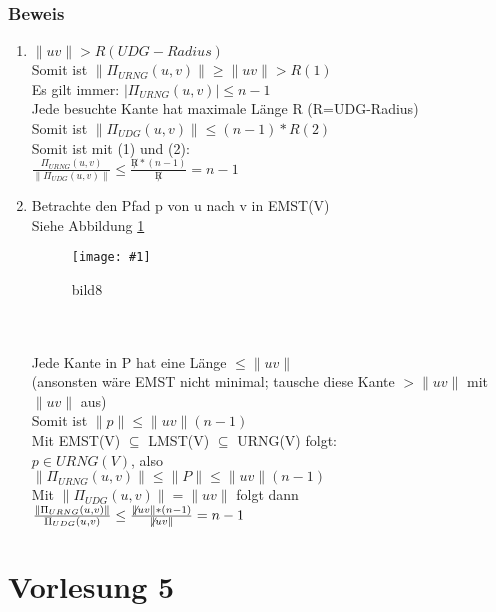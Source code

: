 \documentclass{article}
\newcommand{\bild}[4]{ %
	\begin{figure}[h!]
		\centering
		\texttt{[image: \#1]}
		\caption{#3}
		\label{#4}
	\end{figure}	
}
\newcommand{\sieheBild}[4]{
	Siehe Abbildung \ref{#4}
	\bild{#1}{#2}{#3}{#4}
}
\newcommand{\doubleAbs}[1]{
	\|#1\|
}
\begin{document}
\subsubsection*{Beweis}
\begin{enumerate}
	\item $\doubleAbs{uv} > R (UDG-Radius)$ \\
	Somit ist $\doubleAbs{\Pi_{URNG}(u,v)} \geq \doubleAbs{uv} > R (1)$\\
	Es gilt immer: $|\Pi_{URNG}(u,v)| \leq n-1$\\
	Jede besuchte Kante hat maximale Länge R (R=UDG-Radius)\\
	Somit ist $\doubleAbs{\Pi_{UDG}(u,v)} \leq (n-1) * R (2)$\\
	Somit ist mit (1) und (2):
	\\
	$\frac{\Pi_{URNG}(u,v)}{\doubleAbs{\Pi_{UDG}(u,v)}} \leq \frac{\not R * (n-1)}{\not R} = n-1$
	\item Betrachte den Pfad p von u nach v in EMST(V)
	\\
	\sieheBild{Bilder/8.png}{0.4}{bild8}{Bild 8}\\
	\\
	Jede Kante in P hat eine Länge $\leq \doubleAbs{uv}$\\
	(ansonsten wäre EMST nicht minimal; tausche diese Kante $> \doubleAbs{uv}$ mit $\doubleAbs{uv}$ aus)\\
	Somit ist $\doubleAbs{p} \leq \doubleAbs{uv} (n-1)$
	\\
	Mit EMST(V) $ \subseteq$ LMST(V) $\subseteq$ URNG(V) folgt:\\
	$p \in URNG(V)$, also\\
	$\doubleAbs{\Pi_{URNG}(u,v)} \leq \doubleAbs{P} \leq \doubleAbs{uv}(n-1)$\\
	Mit $\doubleAbs{\Pi_{UDG}(u,v)} = \doubleAbs{uv}$ folgt dann\\
	$\frac{\doubleAbs{\Pi_{URNG}(u,v)}}{\Pi_{UDG}(u,v)} \leq \frac{\not\doubleAbs{uv}* (n-1)}{\not\doubleAbs{uv}} = n-1$
\end{enumerate}

\section{Vorlesung 5}
\end{document}
